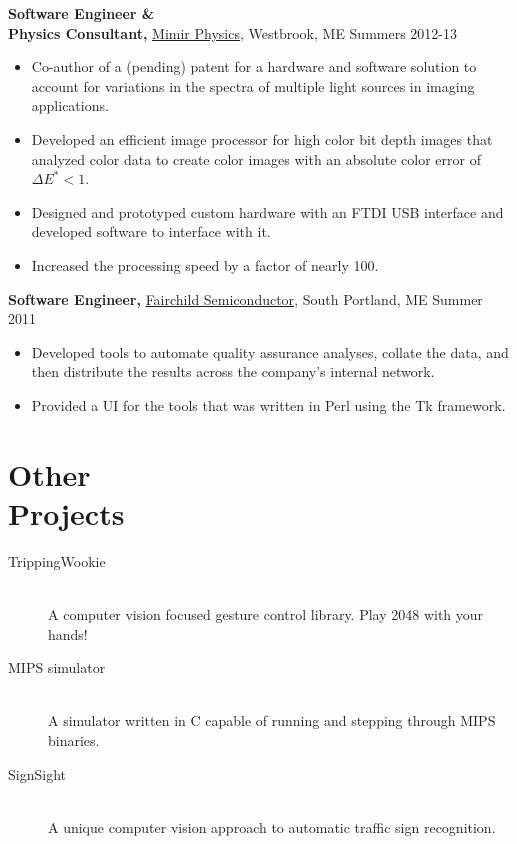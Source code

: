 \documentclass[margin]{res}
\begin{document}
\begin{resume}
{\bf Software Engineer \& \\ Physics Consultant,} \uline{Mimir Physics}, Westbrook, ME \hfill Summers 2012-13
 \begin{itemize} \itemsep -2pt  %
 \item Co-author of a (pending) patent for a hardware and software solution to account for variations in the spectra of multiple light sources in imaging applications.
 \item Developed an efficient image processor for high color bit depth images that analyzed color data to create color images with an absolute color error of $\Delta E^* < 1$.
 \item Designed and prototyped custom hardware with an FTDI USB interface  and developed software to interface with it.
 \item Increased the processing speed by a factor of nearly 100.
 \end{itemize}

 
 
{\bf Software Engineer,} \uline{Fairchild Semiconductor}, South Portland, ME \hfill  Summer 2011
\begin{itemize} \itemsep -2pt %
 \item Developed tools to automate quality assurance analyses, collate the data, and then distribute the results across the company's internal network.
 \item Provided a UI for the tools that was written in Perl using the Tk framework.
\end{itemize}

\section{Other \\ Projects}
\begin{description}
	\item[TrippingWookie] \hfil \\
		A computer vision focused gesture control library. Play 2048 with your hands!
	\item[MIPS simulator] \hfil \\
		A simulator written in C capable of running and stepping through MIPS binaries.
	\item[SignSight] \hfil \\
		A unique computer vision approach to automatic traffic sign recognition.
\end{description}


\end{resume}
\end{document}
